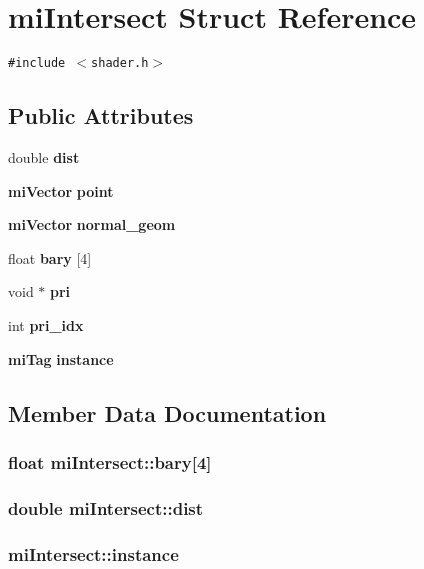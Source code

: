 \section{mi\-Intersect Struct Reference}
\label{structmiIntersect}
{\tt \#include $<$shader.h$>$}

\subsection*{Public Attributes}
\begin{CompactItemize}
\item 
double {\bf dist}
\item 
{\bf mi\-Vector} {\bf point}
\item 
{\bf mi\-Vector} {\bf normal\_\-geom}
\item 
float {\bf bary} [4]
\item 
void $\ast$ {\bf pri}
\item 
int {\bf pri\_\-idx}
\item 
{\bf mi\-Tag} {\bf instance}
\end{CompactItemize}


\subsection{Member Data Documentation}
\subsubsection{\setlength{\rightskip}{0pt plus 5cm}float {\bf mi\-Intersect::bary}[4]}\label{structmiIntersect_o3}


\subsubsection{\setlength{\rightskip}{0pt plus 5cm}double {\bf mi\-Intersect::dist}}\label{structmiIntersect_o0}


\subsubsection{ {\bf mi\-Intersect::instance}}\label{structmiIntersect_o6}


